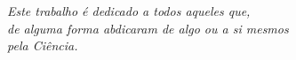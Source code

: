 \vspace*{\fill}
   \centering
   \noindent
   \textit{Este trabalho é dedicado a todos aqueles que,\\
   de alguma forma abdicaram de algo ou a si mesmos\\
   pela Ciência.} \vspace*{\fill}
